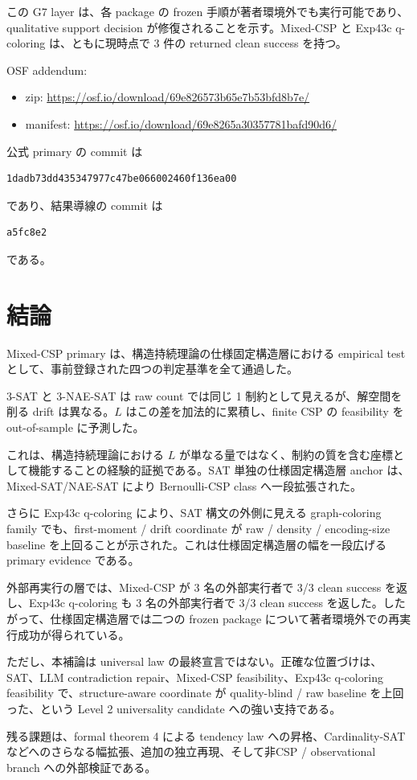 \documentclass[12pt,a4paper]{article}
\begin{document}
この G7 layer は、各 package の frozen 手順が著者環境外でも実行可能であり、qualitative support decision が修復されることを示す。Mixed-CSP と Exp43c q-coloring は、ともに現時点で 3 件の returned clean success を持つ。

OSF addendum:

\begin{itemize}
\tightlist
\item
  zip: \url{https://osf.io/download/69e826573b65e7b53bfd8b7e/}
\item
  manifest: \url{https://osf.io/download/69e8265a30357781bafd90d6/}
\end{itemize}

公式 primary の commit は

\begin{verbatim}
1dadb73dd435347977c47be066002460f136ea00
\end{verbatim}

であり、結果導線の commit は

\begin{verbatim}
a5fc8e2
\end{verbatim}

である。

\section{結論}\label{ux7d50ux8ad6}

Mixed-CSP primary は、構造持続理論の仕様固定構造層における empirical test として、事前登録された四つの判定基準を全て通過した。

3-SAT と 3-NAE-SAT は raw count では同じ 1 制約として見えるが、解空間を削る drift は異なる。\(L\) はこの差を加法的に累積し、finite CSP の feasibility を out-of-sample に予測した。

これは、構造持続理論における \(L\) が単なる量ではなく、制約の質を含む座標として機能することの経験的証拠である。SAT 単独の仕様固定構造層 anchor は、Mixed-SAT/NAE-SAT により Bernoulli-CSP class へ一段拡張された。

さらに Exp43c q-coloring により、SAT 構文の外側に見える graph-coloring family でも、first-moment / drift coordinate が raw / density / encoding-size baseline を上回ることが示された。これは仕様固定構造層の幅を一段広げる primary evidence である。

外部再実行の層では、Mixed-CSP が 3 名の外部実行者で 3/3 clean success を返し、Exp43c q-coloring も 3 名の外部実行者で 3/3 clean success を返した。したがって、仕様固定構造層では二つの frozen package について著者環境外での再実行成功が得られている。

ただし、本補論は universal law の最終宣言ではない。正確な位置づけは、SAT、LLM contradiction repair、Mixed-CSP feasibility、Exp43c q-coloring feasibility で、structure-aware coordinate が quality-blind / raw baseline を上回った、という Level 2 universality candidate への強い支持である。

残る課題は、formal theorem 4 による tendency law への昇格、Cardinality-SAT などへのさらなる幅拡張、追加の独立再現、そして非CSP / observational branch への外部検証である。
\end{document}
